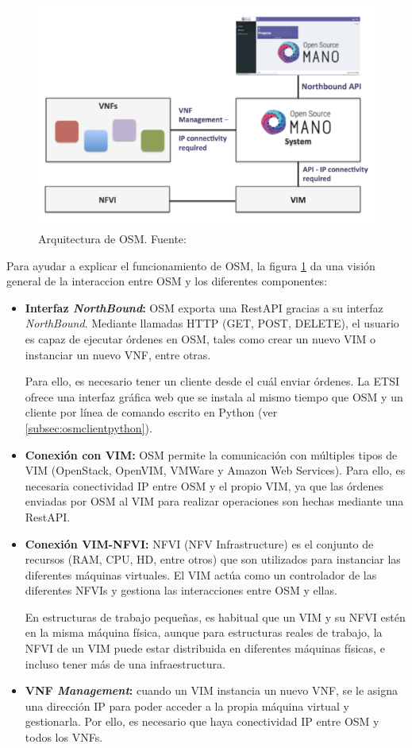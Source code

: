 \clearpage

\begin{figure}[!ht]
	\centering
	\includegraphics[width=0.8\linewidth]{imagenes/osm_arch}
	\caption{Arquitectura de OSM. 
		Fuente: \cite{osmwikibib}}
	\label{fig:osmarch}
\end{figure}

Para ayudar a explicar el funcionamiento de OSM, la figura \ref{fig:osmarch} da una visión general de la interaccion entre OSM y los diferentes componentes:

\begin{itemize}
	\item \textbf{Interfaz \textit{NorthBound}:} OSM exporta una RestAPI gracias a su interfaz \textit{NorthBound}. Mediante llamadas HTTP (GET, POST, DELETE), el usuario es capaz de ejecutar órdenes en OSM, tales como crear un nuevo VIM o instanciar un nuevo VNF, entre otras.
	
	Para ello, es necesario tener un cliente desde el cuál enviar órdenes. La ETSI ofrece una interfaz gráfica web que se instala al mismo tiempo que OSM y un cliente por línea de comando escrito en Python (ver \ref{subsec:osmclientpython}).
	
	\item \textbf{Conexión con VIM:} OSM permite la comunicación con múltiples tipos de VIM (OpenStack, OpenVIM, VMWare y Amazon Web Services). Para ello, es necesaria conectividad IP entre OSM y el propio VIM, ya que las órdenes enviadas por OSM al VIM para realizar operaciones son hechas mediante una RestAPI.
	
	\item \textbf{Conexión VIM-NFVI:} NFVI (NFV Infrastructure) es el conjunto de recursos (RAM, CPU, HD, entre otros) que son utilizados para instanciar las diferentes máquinas virtuales. El VIM actúa como un controlador de las diferentes NFVIs y gestiona las interacciones entre OSM y ellas.
	
	En estructuras de trabajo pequeñas, es habitual que un VIM y su NFVI estén en la misma máquina física, aunque para estructuras reales de trabajo, la NFVI de un VIM puede estar distribuida en diferentes máquinas físicas, e incluso tener más de una infraestructura.
	
	\item \textbf{VNF \textit{Management}:} cuando un VIM instancia un nuevo VNF, se le asigna una dirección IP para poder acceder a la propia máquina virtual y gestionarla. Por ello, es necesario que haya conectividad IP entre OSM y todos los VNFs. 
\end{itemize}

